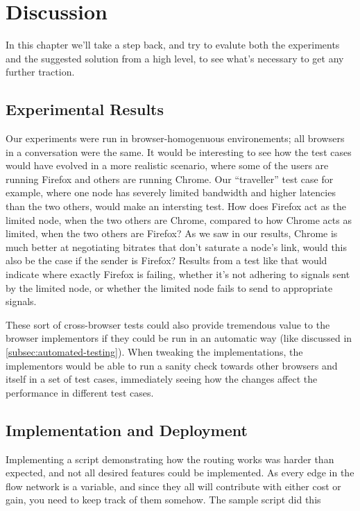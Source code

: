 \chapter{Discussion}
\label{chp:discussion}

In this chapter we'll take a step back, and try to evalute both the experiments and the suggested solution from a high level, to see what's necessary to get any further traction.

\section{Experimental Results}

Our experiments were run in browser-homogenuous environements; all browsers in a conversation were the same. It would be interesting to see how the test cases would have evolved in a more realistic scenario, where some of the users are running Firefox and others are running Chrome. Our ``traveller'' test case for example, where one node has severely limited bandwidth and higher latencies than the two others, would make an intersting test. How does Firefox act as the limited node, when the two others are Chrome, compared to how Chrome acts as limited, when the two others are Firefox? As we saw in our results, Chrome is much better at negotiating bitrates that don't saturate a node's link, would this also be the case if the sender is Firefox? Results from a test like that would indicate where exactly Firefox is failing, whether it's not adhering to signals sent by the limited node, or whether the limited node fails to send to appropriate signals.

These sort of cross-browser tests could also provide tremendous value to the browser implementors if they could be run in an automatic way (like discussed in \autoref{subsec:automated-testing}). When tweaking the implementations, the implementors would be able to run a sanity check towards other browsers and itself in a set of test cases, immediately seeing how the changes affect the performance in different test cases.


\section{Implementation and Deployment}

Implementing a script demonstrating how the routing works was harder than expected, and not all desired features could be implemented. As every edge in the flow network is a variable, and since they all will contribute with either cost or gain, you need to keep track of them somehow. The sample script did this

